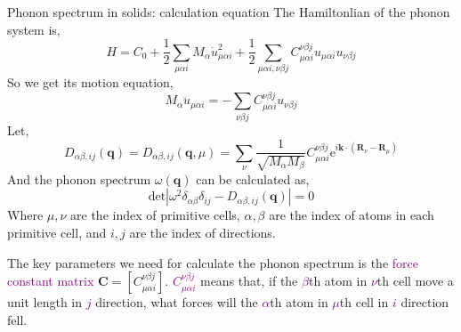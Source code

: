 \documentclass{beamer}
\begin{document}
\begin{frame}{Phonon spectrum in solids: calculation equation}\scriptsize
  \color{gray} The Hamiltonlian of the phonon system is,
  \begin{equation}
    H = C_0 + \frac{1}{2}\sum_{\mu\alpha{}i}M_\alpha\dot{u}^2_{\mu\alpha{}i} + \frac{1}{2}\sum_{\mu\alpha{}i,\nu\beta{}j}C^{\nu\beta{}j}_{\mu\alpha{}i}u_{\mu\alpha{}i}u_{\nu\beta{}j}
  \end{equation}
  So we get its motion equation,
  \begin{equation}
    M_\alpha\ddot{u}_{\mu\alpha{}i} = -\sum_{\nu\beta{}j}C^{\nu\beta{}j}_{\mu\alpha{}i}u_{\nu\beta{}j}
  \end{equation}
  Let, 
  \begin{equation}
    D_{\alpha\beta,ij}(\bm{q}) = D_{\alpha\beta,ij}(\bm{q}, \mu)= \sum_\nu\frac{1}{\sqrt{M_\alpha{}M_\beta}}C^{\nu\beta{}j}_{\mu\alpha{}i}\mathrm{e}^{i\bm{k}\cdot(\bm{R}_\nu-\bm{R}_\mu)}
  \end{equation}
  And the phonon spectrum \(\omega(\bm{q})\) can be calculated as,
  \begin{equation}
    \label{eq::ph}
    \mathrm{det}|\omega^2\delta_{\alpha\beta}\delta_{ij}-D_{\alpha\beta,ij}(\bm{q})| = 0
  \end{equation}
  Where \(\mu,\nu\) are the index of primitive cells, \(\alpha,\beta\) are the index of atoms in each primitive cell, and \(i,j\) are the index of directions.
\begin{block}{}
  \color{black} The key parameters we need for calculate the phonon spectrum is the \textcolor{purple}{force constant matrix} \(\bm{C} = [C^{\nu\beta{}j}_{\mu\alpha{}i}]\). \textcolor{purple}{\(C^{\nu\beta{}j}_{\mu\alpha{}i}\)} means that, if the \textcolor{purple}{\(\beta\)}th atom in \textcolor{purple}{\(\nu\)}th cell move a unit length in \textcolor{purple}{\(j\)} direction, what forces will the \textcolor{purple}{\(\alpha\)}th atom in \textcolor{purple}{\(\mu\)}th cell in \textcolor{purple}{\(i\)} direction fell.
\end{block}
\end{frame}
\end{document}
